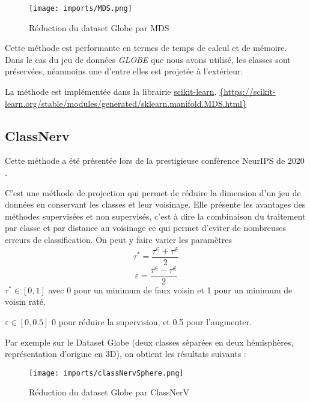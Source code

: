 \begin{center}
    \begin{figure}[ht!]
        \centering
        
        \texttt{[image: imports/MDS.png]}
        
        \caption{Réduction du dataset Globe par MDS}
    \end{figure}
\end{center}

Cette méthode est performante en termes de temps de calcul et de mémoire. Dans le cas du jeu de données \textit{GLOBE} que nous avons utilisé, les classes sont préservées, néanmoins une d'entre elles est projetée à l'extérieur.

La méthode est implémentée dans la librairie \href{https://scikit-learn.org/stable/modules/generated/sklearn.manifold.MDS.html}{scikit-learn}.
\url{{https://scikit-learn.org/stable/modules/generated/sklearn.manifold.MDS.html}}


\subsection{ClassNerv}
 Cette méthode a été présentée lors de la prestigieuse conférence NeurIPS de 2020 \cite{colange_steering_2020}.

 C'est une méthode de projection qui permet de réduire la dimension d'un jeu de données en conservant les classes et leur voisinage. 
 Elle présente les avantages des méthodes supervisées et non supervisés, c'est à dire la combinaison du traitement par classe et par distance au voisinage ce qui permet
 d'eviter de nombreuses erreurs de classification.
 On peut y faire varier les paramètres \[\tau^*=\dfrac{\tau^\in + \tau^{\not\in}}{2}\]  \[\varepsilon=\dfrac{\tau^\in - \tau^{\not\in}}{2}\]  
 $ \tau^* \in [0,1] $ avec 0 pour un minimum de faux voisin et 1 pour un minimum de voisin raté. 
 
 \noindent $\varepsilon \in [0,0.5]$ 0 pour réduire la supervision, et 0.5 pour l'augmenter. 
 
 \noindent
 Par exemple sur le Dataset Globe (deux classes séparées en deux hémisphères, représentation d'origine en 3D), on obtient les résultats suivants :
 \begin{center}
    \begin{figure}[ht!]
        \centering
        
        \texttt{[image: imports/classNervSphere.png]}
        
        \caption{Réduction du dataset Globe par ClassNerV}
    \end{figure}
\end{center}
\newpage\vfill\mbox{ }

